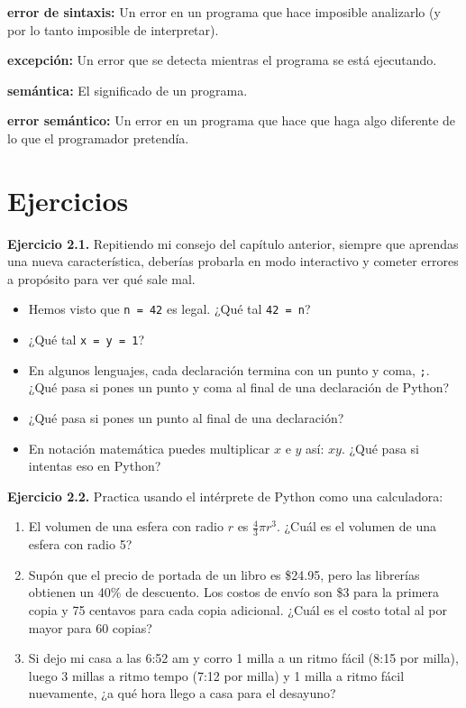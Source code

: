 \textbf{error de sintaxis:} Un error en un programa que hace imposible analizarlo (y por lo tanto imposible de interpretar).

\textbf{excepción:} Un error que se detecta mientras el programa se está ejecutando.

\textbf{semántica:} El significado de un programa.

\textbf{error semántico:} Un error en un programa que hace que haga algo diferente de lo que el programador pretendía.

\section{Ejercicios}

\textbf{Ejercicio 2.1.} Repitiendo mi consejo del capítulo anterior, siempre que aprendas una nueva característica, deberías probarla en modo interactivo y cometer errores a propósito para ver qué sale mal.

\begin{itemize}
\item Hemos visto que \texttt{n = 42} es legal. ¿Qué tal \texttt{42 = n}?
\item ¿Qué tal \texttt{x = y = 1}?
\item En algunos lenguajes, cada declaración termina con un punto y coma, \texttt{;}. ¿Qué pasa si pones un punto y coma al final de una declaración de Python?
\item ¿Qué pasa si pones un punto al final de una declaración?
\item En notación matemática puedes multiplicar $x$ e $y$ así: $xy$. ¿Qué pasa si intentas eso en Python?
\end{itemize}

\textbf{Ejercicio 2.2.} Practica usando el intérprete de Python como una calculadora:

\begin{enumerate}
\item El volumen de una esfera con radio $r$ es $\frac{4}{3}\pi r^3$. ¿Cuál es el volumen de una esfera con radio 5?

\item Supón que el precio de portada de un libro es \$24.95, pero las librerías obtienen un 40\% de descuento. Los costos de envío son \$3 para la primera copia y 75 centavos para cada copia adicional. ¿Cuál es el costo total al por mayor para 60 copias?

\item Si dejo mi casa a las 6:52 am y corro 1 milla a un ritmo fácil (8:15 por milla), luego 3 millas a ritmo tempo (7:12 por milla) y 1 milla a ritmo fácil nuevamente, ¿a qué hora llego a casa para el desayuno?
\end{enumerate}